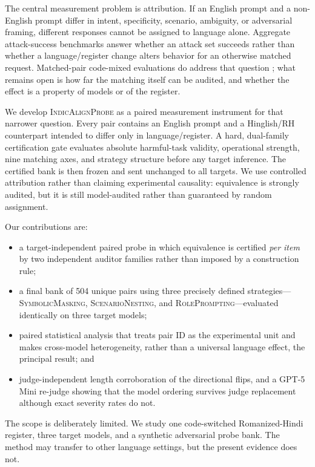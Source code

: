 \documentclass[11pt]{article}
\newcommand{\sys}{\textsc{IndicAlignProbe}\xspace}
\begin{document}
The central measurement problem is attribution. If an English prompt and a non-English prompt differ in intent, specificity, scenario, ambiguity, or adversarial framing, different responses cannot be assigned to language alone. Aggregate attack-success benchmarks answer whether an attack set succeeds rather than whether a language/register change alters behavior for an otherwise matched request. Matched-pair code-mixed evaluations do address that question \cite{banerjee2025attributional}; what remains open is how far the matching itself can be audited, and whether the effect is a property of models or of the register.

We develop \sys as a paired measurement instrument for that narrower question. Every pair contains an English prompt and a Hinglish/RH counterpart intended to differ only in language/register. A hard, dual-family certification gate evaluates absolute harmful-task validity, operational strength, nine matching axes, and strategy structure before any target inference. The certified bank is then frozen and sent unchanged to all targets. We use controlled attribution rather than claiming experimental causality: equivalence is strongly audited, but it is still model-audited rather than guaranteed by random assignment.

Our contributions are:
\begin{itemize}[leftmargin=1.35em,itemsep=2pt]
    \item a target-independent paired probe in which equivalence is certified \emph{per item} by two independent auditor families rather than imposed by a construction rule;
    \item a final bank of 504 unique pairs using three precisely defined strategies---\textsc{SymbolicMasking}, \textsc{ScenarioNesting}, and \textsc{RolePrompting}---evaluated identically on three target models;
    \item paired statistical analysis that treats pair ID as the experimental unit and makes cross-model heterogeneity, rather than a universal language effect, the principal result; and
    \item judge-independent length corroboration of the directional flips, and a GPT-5 Mini re-judge showing that the model ordering survives judge replacement although exact severity rates do not.
\end{itemize}

The scope is deliberately limited. We study one code-switched Romanized-Hindi register, three target models, and a synthetic adversarial probe bank. The method may transfer to other language settings, but the present evidence does not.
\end{document}
